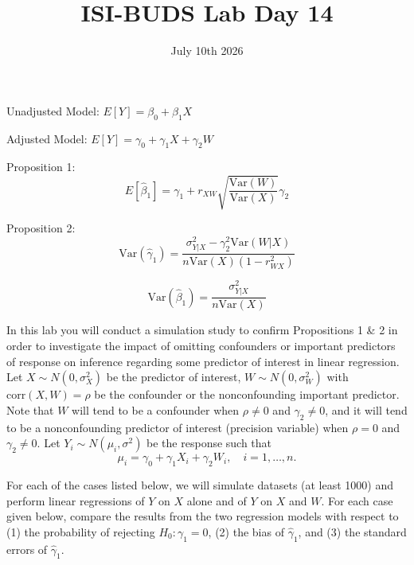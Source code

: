 \documentclass{article}
\title{ISI-BUDS Lab Day 14}
\date{July 10th 2026}
\begin{document}
\maketitle

Unadjusted Model: $E[Y] = \beta_0 + \beta_1 X$

\vspace{2pt}

Adjusted Model: $E[Y] = \gamma_0 + \gamma_1 X + \gamma_2 W$

\vspace{5pt}

Proposition 1: 
$$E[\hat{\beta}_1] = \gamma_1 + r_{XW} \sqrt{\frac{\text{Var}(W)}{\text{Var}(X)}} \gamma_2$$

Proposition 2: 
$$\text{Var}(\hat{\gamma}_1) = \frac{\sigma^2_{Y|X} - \gamma_2^2 \text{Var}(W|X)}{n \text{Var}(X) (1 - r_{WX}^2)}$$

$$\text{Var}(\hat{\beta}_1) = \frac{\sigma^2_{Y|X}}{n \text{Var}(X)}$$




In this lab you will conduct a simulation study to confirm Propositions 1 \& 2 in order to investigate the impact of omitting confounders or important predictors of response on inference regarding some predictor of interest in linear regression. Let $X \sim N(0, \sigma_X^2)$ be the predictor of interest, $W \sim N(0, \sigma_W^2)$ with $\text{corr}(X, W) = \rho$ be the confounder or the nonconfounding important predictor. Note that $W$ will tend to be a confounder when $\rho \neq 0$ and $\gamma_2 \neq 0$, and it will tend to be a nonconfounding predictor of interest (precision variable) when $\rho = 0$ and $\gamma_2 \neq 0$. Let $Y_i \sim N(\mu_i, \sigma^2)$ be the response such that
$$ \mu_i = \gamma_0 + \gamma_1X_i + \gamma_2W_i, \quad i = 1, \dots, n. $$

For each of the cases listed below, we will simulate datasets (at least 1000) and perform linear regressions of $Y$ on $X$ alone and of $Y$ on $X$ and $W$. For each case given below, compare the results from the two regression models with respect to (1) the probability of rejecting $H_0: \gamma_1 = 0$, (2) the bias of $\hat{\gamma}_1$, and (3) the standard errors of $\hat{\gamma}_1$.
\end{document}
